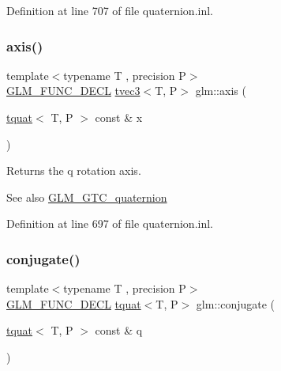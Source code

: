 Definition at line 707 of file quaternion.\+inl.

\mbox{\label{group__gtc__quaternion_ga0b3e87a13b2708154b72259e50789a19}} 
\subsubsection{\texorpdfstring{axis()}{axis()}}
{\footnotesize\ttfamily template$<$typename T , precision P$>$ \\
\mbox{\hyperlink{setup_8hpp_ab2d052de21a70539923e9bcbf6e83a51}{G\+L\+M\+\_\+\+F\+U\+N\+C\+\_\+\+D\+E\+CL}} \mbox{\hyperlink{structglm_1_1tvec3}{tvec3}}$<$T, P$>$ glm\+::axis (\begin{DoxyParamCaption}\item[{\mbox{\hyperlink{structglm_1_1tquat}{tquat}}$<$ T, P $>$ const \&}]{x }\end{DoxyParamCaption})}

Returns the q rotation axis.

\begin{DoxySeeAlso}{See also}
\mbox{\hyperlink{group__gtc__quaternion}{G\+L\+M\+\_\+\+G\+T\+C\+\_\+quaternion}} 
\end{DoxySeeAlso}


Definition at line 697 of file quaternion.\+inl.

\mbox{\label{group__gtc__quaternion_gab1ace864fbf189ffa368950001808a3c}} 
\subsubsection{\texorpdfstring{conjugate()}{conjugate()}}
{\footnotesize\ttfamily template$<$typename T , precision P$>$ \\
\mbox{\hyperlink{setup_8hpp_ab2d052de21a70539923e9bcbf6e83a51}{G\+L\+M\+\_\+\+F\+U\+N\+C\+\_\+\+D\+E\+CL}} \mbox{\hyperlink{structglm_1_1tquat}{tquat}}$<$T, P$>$ glm\+::conjugate (\begin{DoxyParamCaption}\item[{\mbox{\hyperlink{structglm_1_1tquat}{tquat}}$<$ T, P $>$ const \&}]{q }\end{DoxyParamCaption})}

